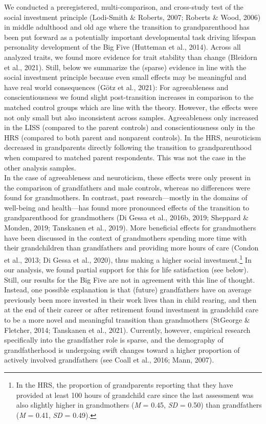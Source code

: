 \documentclass[
  english,
  man, noextraspace]{apa7}
\begin{document}
We conducted a preregistered, multi-comparison, and cross-study test of the social investment principle (Lodi-Smith \& Roberts, 2007; Roberts \& Wood, 2006) in middle adulthood and old age where the transition to grandparenthood has been put forward as a potentially important developmental task driving lifespan personality development of the Big Five (Hutteman et al., 2014). Across all analyzed traits, we found more evidence for trait stability than change (Bleidorn et al., 2021). Still, below we summarize the (sparse) evidence in line with the social investment principle because even small effects may be meaningful and have real world consequences (Götz et al., 2021): For agreeableness and conscientiousness we found slight post-transition increases in comparison to the matched control groups which are line with the theory. However, the effects were not only small but also inconsistent across samples. Agreeableness only increased in the LISS (compared to the parent controls) and conscientiousness only in the HRS (compared to both parent and nonparent controls). In the HRS, neuroticism decreased in grandparents directly following the transition to grandparenthood when compared to matched parent respondents. This was not the case in the other analysis samples.\\
In the case of agreeableness and neuroticism, these effects were only present in the comparison of grandfathers and male controls, whereas no differences were found for grandmothers. In contrast, past research---mostly in the domains of well-being and health---has found more pronounced effects of the transition to grandparenthood for grandmothers (Di Gessa et al., 2016b, 2019; Sheppard \& Monden, 2019; Tanskanen et al., 2019). More beneficial effects for grandmothers have been discussed in the context of grandmothers spending more time with their grandchildren than grandfathers and providing more hours of care (Condon et al., 2013; Di Gessa et al., 2020), thus making a higher social investment.\footnote{In the HRS, the proportion of grandparents reporting that they have provided at least 100 hours of grandchild care since the last assessment was also slightly higher in grandmothers (\emph{M} = 0.45, \emph{SD} = 0.50) than grandfathers (\emph{M} = 0.41, \emph{SD} = 0.49).} In our analysis, we found partial support for this for life satisfaction (see below). Still, our results for the Big Five are not in agreement with this line of thought. Instead, one possible explanation is that (future) grandfathers have on average previously been more invested in their work lives than in child rearing, and then at the end of their career or after retirement found investment in grandchild care to be a more novel and meaningful transition than grandmothers (StGeorge \& Fletcher, 2014; Tanskanen et al., 2021). Currently, however, empirical research specifically into the grandfather role is sparse, and the demography of grandfatherhood is undergoing swift changes toward a higher proportion of actively involved grandfathers (see Coall et al., 2016; Mann, 2007).\\
\end{document}

